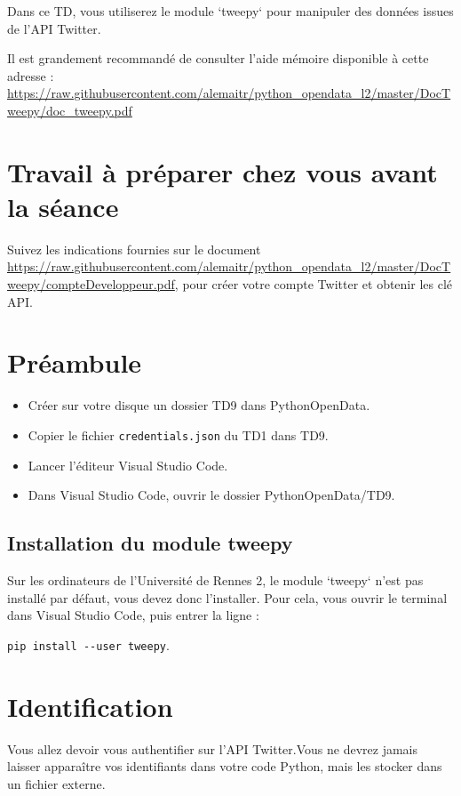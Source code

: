 \documentclass[11pt,a4paper]{article}
\begin{document}
Dans ce TD, vous utiliserez le module `tweepy` pour manipuler des données issues de l'API Twitter.

Il est grandement recommandé de consulter l'aide mémoire disponible à cette adresse : 
\url{https://raw.githubusercontent.com/alemaitr/python_opendata_l2/master/DocTweepy/doc_tweepy.pdf}

\section*{Travail à préparer chez vous avant la séance}

Suivez les indications fournies sur le document \url{https://raw.githubusercontent.com/alemaitr/python_opendata_l2/master/DocTweepy/compteDeveloppeur.pdf}, pour créer votre compte Twitter et obtenir les clé API. 

\section*{Préambule}
\begin{itemize}
    \item Créer sur votre disque un dossier TD9 dans PythonOpenData. 
    \item Copier le fichier \verb+credentials.json+ du TD1 dans TD9.
    \item Lancer l'éditeur Visual Studio Code.
    \item Dans Visual Studio Code, ouvrir le dossier PythonOpenData/TD9. 
\end{itemize}

\subsection*{Installation du module tweepy}

Sur les ordinateurs de l'Université de Rennes 2, le module `tweepy` n'est pas installé par défaut, vous devez donc l'installer. Pour cela, vous ouvrir le terminal dans Visual Studio Code, puis entrer la ligne : 

\verb+pip install --user tweepy+.

\section{Identification}

Vous allez devoir vous authentifier sur l'API Twitter.Vous ne devrez jamais laisser apparaître vos identifiants dans votre code Python, mais les stocker dans un fichier externe.
\end{document}
